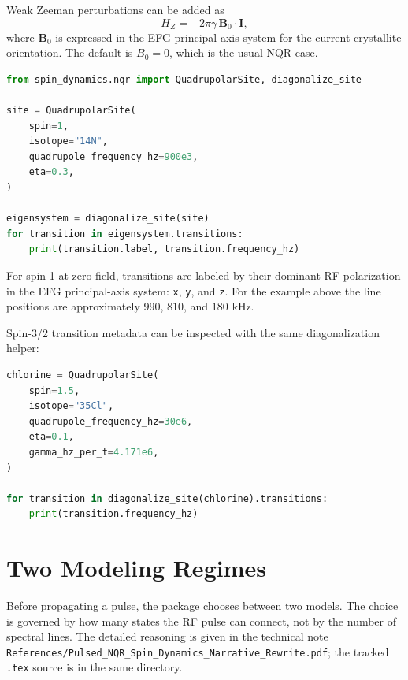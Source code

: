 \documentclass[11pt,oneside]{report}
\newcommand{\code}[1]{\texttt{#1}}
\begin{document}
Weak Zeeman perturbations can be added as
\[
  H_Z = -2\pi \gamma\, \mathbf{B}_0\cdot\mathbf{I},
\]
where \(\mathbf{B}_0\) is expressed in the EFG principal-axis system for the
current crystallite orientation. The default is \(B_0=0\), which is the usual
NQR case.

\begin{lstlisting}[language=Python]
from spin_dynamics.nqr import QuadrupolarSite, diagonalize_site

site = QuadrupolarSite(
    spin=1,
    isotope="14N",
    quadrupole_frequency_hz=900e3,
    eta=0.3,
)

eigensystem = diagonalize_site(site)
for transition in eigensystem.transitions:
    print(transition.label, transition.frequency_hz)
\end{lstlisting}

For spin-1 at zero field, transitions are labeled by their dominant RF
polarization in the EFG principal-axis system: \code{x}, \code{y}, and
\code{z}. For the example above the line positions are approximately
\(990\), \(810\), and \(180\) kHz.

Spin-3/2 transition metadata can be inspected with the same diagonalization
helper:

\begin{lstlisting}[language=Python]
chlorine = QuadrupolarSite(
    spin=1.5,
    isotope="35Cl",
    quadrupole_frequency_hz=30e6,
    eta=0.1,
    gamma_hz_per_t=4.171e6,
)

for transition in diagonalize_site(chlorine).transitions:
    print(transition.frequency_hz)
\end{lstlisting}

\section{Two Modeling Regimes}
\label{sec:nqr-regimes}

Before propagating a pulse, the package chooses between two models. The choice
is governed by how many states the RF pulse can connect, not by the number of
spectral lines. The detailed reasoning is given in the technical note
\code{References/Pulsed\_NQR\_Spin\_Dynamics\_Narrative\_Rewrite.pdf}; the
tracked \code{.tex} source is in the same directory.
\end{document}
